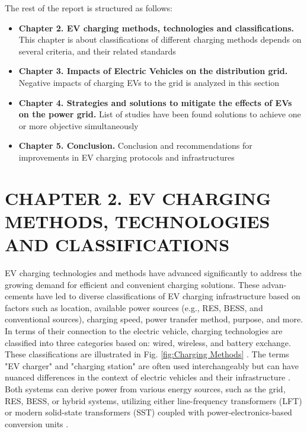 \documentclass{thesis}
\begin{document}
The rest of the report is structured as follows:
\begin{itemize}
    \item \textbf{Chapter 2. EV charging methods, technologies and classifications.} This chapter is about classifications of different charging methods depends on several criteria, and their related standards
    \item \textbf{Chapter 3. Impacts of Electric Vehicles on the distribution grid.} Negative impacts of charging EVs to the grid is analyzed in this section
    \item \textbf{Chapter 4. Strategies and solutions to mitigate the effects of EVs on the power grid.} List of studies have been found solutions to achieve one or more objective simultaneously
    \item \textbf{Chapter 5. Conclusion.} Conclusion and recommendations for improvements in EV charging protocols and infrastructures
\end{itemize}

\newpage


\section*{CHAPTER 2. EV CHARGING METHODS, TECHNOLOGIES AND CLASSIFICATIONS}
\label{chuong2}

\setcounter{section}{2} 
    \setcounter{subsection}{0}
        \setcounter{figure}{0}
            \setcounter{table}{0}

EV charging technologies and methods have advanced significantly to address the growing demand for efficient and convenient charging solutions. These advan-cements have led to diverse classifications of EV charging infrastructure based on factors such as location, available power sources (e.g., RES, BESS, and conventional sources), charging speed, power transfer method, purpose, and more. In terms of their connection to the electric vehicle, charging technologies are classified into three categories based on: wired, wireless, and battery exchange. These classifications are illustrated in Fig. \ref{fig:Charging Methods} \cite{EVCM}. The terms "EV charger" and "charging station" are often used interchangeably but can have nuanced differences in the context of electric vehicles and their infrastructure \cite{28_in_EVCM}. Both systems can derive power from various energy sources, such as the grid, RES, BESS, or hybrid systems, utilizing either line-frequency transformers (LFT) or modern solid-state transformers (SST) coupled with power-electronics-based conversion units \cite{29_in_EVCM}.
\end{document}

